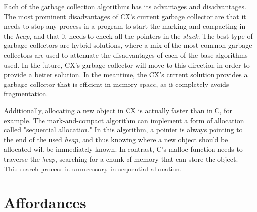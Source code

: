 \documentclass[11pt,fleqn,openany]{book} %
\begin{document}
Each of the garbage collection algorithms has its advantages and disadvantages. The most prominent disadvantages of CX's current garbage collector are that it needs to stop any process in a program to start the marking and compacting in the \emph{heap}, and that it needs to check all the pointers in the \emph{stack}. The best type of garbage collectors are hybrid solutions, where a mix of the most common garbage collectors are used to attenuate the disadvantages of each of the base algorithms used. In the future, CX's garbage collector will move to this direction in order to provide a better solution. In the meantime, the CX's current solution provides a garbage collector that is efficient in memory space, as it completely avoids fragmentation.

Additionally, allocating a new object in CX is actually faster than in C, for example. The mark-and-compact algorithm can implement a form of allocation called "sequential allocation." In this algorithm, a pointer is always pointing to the end of the used \emph{heap}, and thus knowing where a new object should be allocated will be immediately known. In contrast, C's malloc function needs to traverse the \emph{heap}, searching for a chunk of memory that can store the object. This search process is unnecessary in sequential allocation.




\chapter{Affordances}
\label{chapter:affordances}
\end{document}
